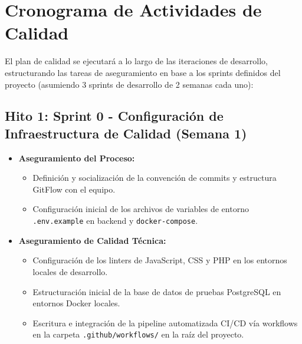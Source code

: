 \section{Cronograma de Actividades de Calidad}

El plan de calidad se ejecutará a lo largo de las iteraciones de desarrollo, estructurando las tareas de aseguramiento en base a los sprints definidos del proyecto (asumiendo 3 sprints de desarrollo de 2 semanas cada uno):

\subsection*{Hito 1: Sprint 0 - Configuración de Infraestructura de Calidad (Semana 1)}
\begin{itemize}
    \item \textbf{Aseguramiento del Proceso:}
    \begin{itemize}
        \item Definición y socialización de la convención de commits y estructura GitFlow con el equipo.
        \item Configuración inicial de los archivos de variables de entorno \texttt{.env.example} en backend y \texttt{docker-compose}.
    \end{itemize}
    \item \textbf{Aseguramiento de Calidad Técnica:}
    \begin{itemize}
        \item Configuración de los linters de JavaScript, CSS y PHP en los entornos locales de desarrollo.
        \item Estructuración inicial de la base de datos de pruebas PostgreSQL en entornos Docker locales.
        \item Escritura e integración de la pipeline automatizada CI/CD vía workflows en la carpeta \texttt{.github/workflows/} en la raíz del proyecto.
    \end{itemize}
\end{itemize}

